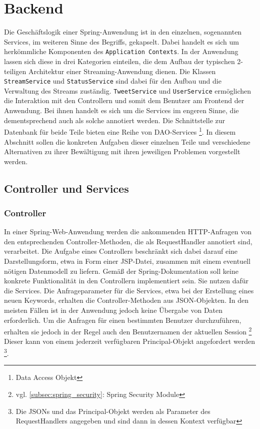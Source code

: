 \section{Backend}

Die Geschäftslogik einer Spring-Anwendung ist in den einzelnen, sogenannten Services, im 
weiteren Sinne des Begriffs, gekapselt. Dabei handelt es sich um herkömmliche Komponenten des 
\texttt{Application Contexts}. In der Anwendung lassen sich diese in drei Kategorien einteilen, 
die dem Aufbau der typischen 2-teiligen Architektur einer Streaming-Anwendung dienen. Die 
Klassen \texttt{StreamService} und \texttt{StatusService} sind dabei für den Aufbau und die 
Verwaltung des Streams zuständig. \texttt{TweetService} und \texttt{UserService} ermöglichen die 
Interaktion mit den Controllern und somit dem Benutzer am Frontend der Anwendung. Bei ihnen 
handelt es sich um die Services im engeren Sinne, die dementsprechend auch als solche annotiert 
werden. Die Schnittstelle zur Datenbank für beide Teile bieten eine Reihe von DAO-Services
\footnote{Data Access Objekt}. In diesem Abschnitt sollen die konkreten Aufgaben dieser 
einzelnen Teile und verschiedene Alternativen zu ihrer Bewältigung mit ihren jeweiligen 
Problemen vorgestellt werden.

\subsection{Controller und Services}
\subsubsection*{Controller}
In einer Spring-Web-Anwendung werden die ankommenden HTTP-Anfragen von den entsprechenden 
Controller-Methoden, die als RequestHandler annotiert sind, verarbeitet. Die Aufgabe eines 
Controllers beschränkt sich dabei darauf eine Darstellungsform, etwa in Form einer JSP-Datei, 
zusammen mit einem eventuell nötigen Datenmodell zu liefern. Gemäß der Spring-Dokumentation soll 
keine konkrete Funktionalität in den Controllern implementiert sein. Sie nutzen dafür die Services. 
Die Anfrageparameter für die Services, etwa bei der Erstellung eines neuen Keywords, erhalten die 
Controller-Methoden aus JSON-Objekten. In den meisten Fällen ist in der Anwendung jedoch keine 
Übergabe von Daten erforderlich. Um die Anfragen für einen bestimmten Benutzer durchzuführen, 
erhalten sie jedoch in der Regel auch den Benutzernamen der aktuellen Session \footnote{vgl. 
\autoref{subsec:spring_security}: Spring Security Module} Dieser kann von einem jederzeit 
verfügbaren Principal-Objekt angefordert werden \footnote{Die JSONs und das Principal-Objekt werden 
als Parameter des RequestHandlers angegeben und sind dann in dessen Kontext verfügbar}.

